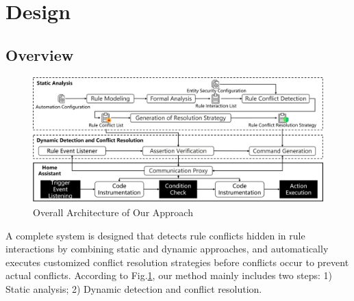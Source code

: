 \section{Design}

\subsection{Overview}
\begin{figure}[htbp]
	\centering
	\includegraphics[width=\textwidth]{figure/overall_design.png}
	\caption{Overall Architecture of Our Approach}
	\label{overall_design}
\end{figure}
A complete system is designed that detects rule conflicts hidden in rule interactions by combining static and dynamic approaches, and automatically executes customized conflict resolution strategies before conflicts occur to prevent actual conflicts. According to Fig.\ref{overall_design}, our method mainly includes two steps: 1) Static analysis; 2) Dynamic detection and conflict resolution.

